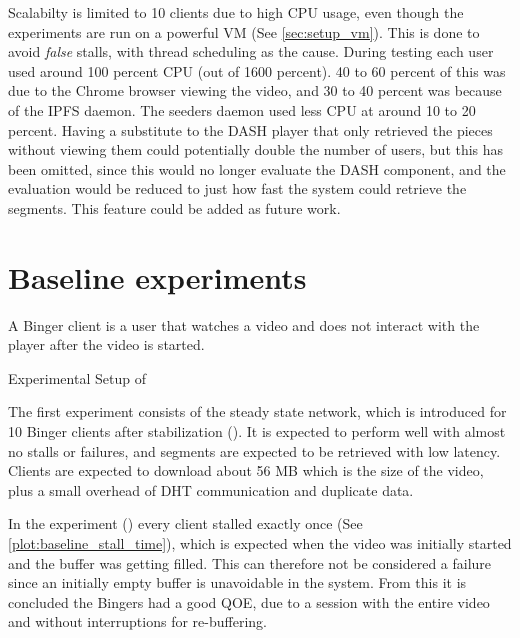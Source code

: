 Scalabilty is limited to 10 clients due to high \ac{CPU} usage, even though the experiments are run on a powerful \ac{VM} (See \autoref{sec:setup_vm}). This is done to avoid \textit{false} stalls, with thread scheduling as the cause. During testing each user used around 100 percent \ac{CPU} (out of 1600 percent). 40 to 60 percent of this was due to the Chrome browser viewing the video, and 30 to 40 percent was because of the \ac{IPFS} daemon. The seeders daemon used less \ac{CPU} at around 10 to 20 percent. Having a substitute to the \ac{DASH} player that only retrieved the pieces without viewing them could potentially double the number of users, but this has been omitted, since this would no longer evaluate the \ac{DASH} component, and the evaluation would be reduced to just how fast the system could retrieve the segments. This feature could be added as future work.

\section{Baseline experiments}
\label{sec:eval_baseline}
A Binger client is a user that watches a video and does not interact with the player after the video is started.

\begin{table}[!htbp]
    \myfloatalign
    \caption[Experimental Setup of Baseline]{Experimental Setup of }
    \label{tab:exp_overview_baseline}
    
\end{table}

The first experiment consists of the steady state network, which is introduced for 10 Binger clients after stabilization (). It is expected to perform well with almost no stalls or failures, and segments are expected to be retrieved with low latency. Clients are expected to download about 56 \ac{MB} which is the size of the video, plus a small overhead of \ac{DHT} communication and duplicate data.

In the experiment () every client stalled exactly once (See \autoref{plot:baseline_stall_time}), which is expected when the video was initially started and the buffer was getting filled. This can therefore not be considered a failure since an initially empty buffer is unavoidable in the system. From this it is concluded the Bingers had a good \ac{QOE}, due to a session with the entire video and without interruptions for re-buffering.

\if{}

\fi

